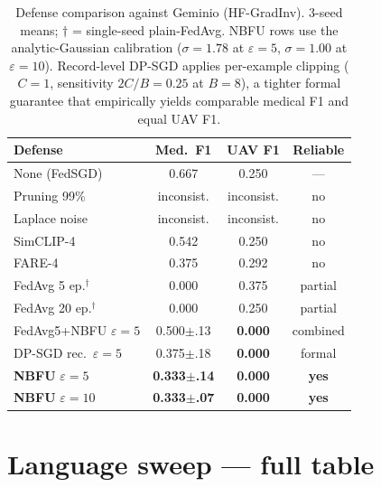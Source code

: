 \documentclass[11pt]{article}
\begin{document}
\begin{table}[h]
\centering
\small
\setlength{\tabcolsep}{3pt}
\begin{tabular}{lccc}
\toprule
Defense & Med.\ F1 & UAV F1 & Reliable \\
\midrule
None (FedSGD)        & 0.667 & 0.250 & --- \\
Pruning 99\%         & inconsist. & inconsist. & no \\
Laplace noise        & inconsist. & inconsist. & no \\
SimCLIP-4            & 0.542 & 0.250 & no \\
FARE-4               & 0.375 & 0.292 & no \\
FedAvg 5 ep.$^\dagger$  & 0.000 & 0.375 & partial \\
FedAvg 20 ep.$^\dagger$ & 0.000 & 0.250 & partial \\
FedAvg5+NBFU $\varepsilon{=}5$ & 0.500$\pm$.13 & \textbf{0.000} & combined \\
DP-SGD rec.\ $\varepsilon{=}5$ & 0.375$\pm$.18 & \textbf{0.000} & formal \\
\textbf{NBFU} $\varepsilon{=}5$ & \textbf{0.333$\pm$.14} & \textbf{0.000} & \textbf{yes} \\
\textbf{NBFU} $\varepsilon{=}10$ & \textbf{0.333$\pm$.07} & \textbf{0.000} & \textbf{yes} \\
\bottomrule
\end{tabular}
\caption{Defense comparison against Geminio (HF-GradInv). 3-seed means; $\dagger$ = single-seed plain-FedAvg. NBFU rows use the analytic-Gaussian calibration ($\sigma{=}1.78$ at $\varepsilon{=}5$, $\sigma{=}1.00$ at $\varepsilon{=}10$). Record-level DP-SGD applies per-example clipping ($C{=}1$, sensitivity $2C/B{=}0.25$ at $B{=}8$), a tighter formal guarantee that empirically yields comparable medical F1 and equal UAV F1.}
\label{tab:defenses}
\end{table}

\clearpage
\section{Language sweep — full table}
\label{app:langsweep}


\end{document}

